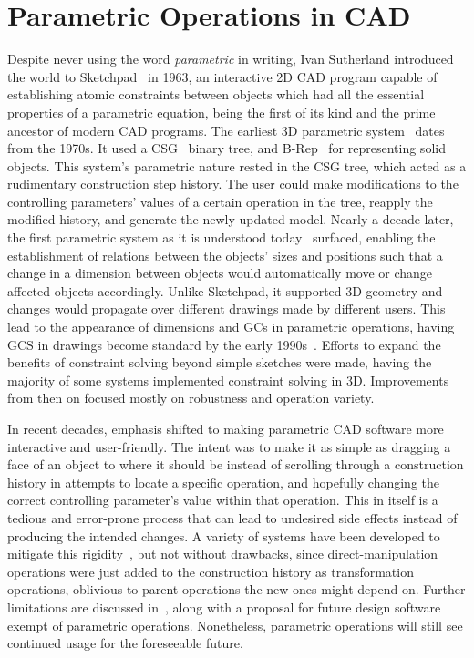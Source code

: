\section{Parametric Operations in \acs{CAD}}%
\label{sec:intro.parametric}

Despite never using the word \textit{parametric} in writing, Ivan Sutherland
introduced the world to Sketchpad~\cite{Sutherland:1964:Sketchpad} in 1963, an
interactive 2D \ac{CAD} program capable of establishing atomic constraints
between objects which had all the essential properties of a parametric equation,
being the first of its kind and the prime ancestor of modern \ac{CAD} programs.
The earliest 3D parametric system~\cite{Requicha:1980:RRS:356827.356833} dates
from the 1970s.  It used a \ac{CSG}~\cite{Foley:1996:CGPP,Requicha:1977:CSG}
binary tree, and \ac{B-Rep}~\cite{Stroud:2006:BRMT} for representing solid
objects.  This system's parametric nature rested in the \ac{CSG} tree, which
acted as a rudimentary construction step history.  The user could make
modifications to the controlling parameters' values of a certain operation in
the tree, reapply the modified history, and generate the newly updated model.
Nearly a decade later, the first parametric system as it is understood
today~\cite{Jabi:2013:PDA,PTC:1980:ProENGINEER} surfaced, enabling the
establishment of relations between the objects' sizes and positions such that a
change in a dimension between objects would automatically move or change
affected objects accordingly.  Unlike Sketchpad, it supported 3D geometry and
changes would propagate over different drawings made by different users.  This
lead to the appearance of dimensions and \acp{GC} in parametric operations,
having \ac{GCS} in drawings become standard by the early
1990s~\cite{Bouma:1995:GCS,Chung:1990:TEVPD,Owen:1991:ASGDC}.  Efforts to expand
the benefits of constraint solving beyond simple sketches were made, having the
majority of some systems implemented constraint solving in 3D.  Improvements
from then on focused mostly on robustness and operation variety.

In recent decades, emphasis shifted to making parametric \ac{CAD} software more
interactive and user-friendly.  The intent was to make it as simple as dragging
a face of an object to where it should be instead of scrolling through a
construction history in attempts to locate a specific operation, and hopefully
changing the correct controlling parameter's value within that operation.  This
in itself is a tedious and error-prone process that can lead to undesired
side effects instead of producing the intended changes.  A variety of systems
have been developed to mitigate this
rigidity~\cite{Clarke:2009:SM,Samuel:2006:CPPUP,Wu:2007:MSMSM}, but not without
drawbacks, since direct-manipulation operations were just added to the
construction history as transformation operations, oblivious to parent
operations the new ones might depend on.  Further limitations are discussed
in~\cite{Bettig:2005:LPOSSD}, along with a proposal for future design software
exempt of parametric operations.  Nonetheless, parametric operations will still
see continued usage for the foreseeable future.
